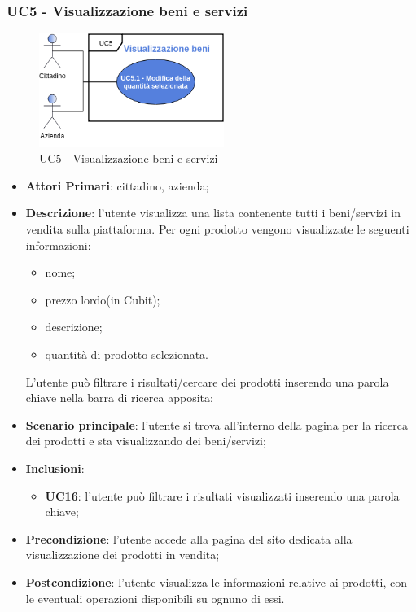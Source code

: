  \subsubsection{UC5 - Visualizzazione beni e servizi}
  \begin{figure}[H]
 	\includegraphics[width=6cm]{res/images/UC5-Generale.png}
 	\centering
 	\caption{UC5 - Visualizzazione beni e servizi}
 \end{figure}
 \begin{itemize}
 	\item \textbf{Attori Primari}: cittadino, azienda;
 	\item \textbf{Descrizione}: l'utente visualizza una lista contenente tutti i beni/servizi in vendita sulla piattaforma. Per ogni prodotto vengono visualizzate le seguenti informazioni:
 	\begin{itemize}
 		\item nome;
 		\item prezzo lordo\glosp (in Cubit\glo);
 		\item descrizione;
 		\item quantità di prodotto selezionata.
 	\end{itemize}
 	L'utente può filtrare i risultati/cercare dei prodotti inserendo una parola chiave nella barra di ricerca apposita;
 	\item \textbf{Scenario principale}: l'utente si trova all'interno della pagina per la ricerca dei prodotti e sta visualizzando dei beni/servizi;
	\item \textbf{Inclusioni}:
	\begin{itemize}
		\item \textbf{UC16}: l'utente può filtrare i risultati visualizzati inserendo una parola chiave;
	\end{itemize}
 	\item \textbf{Precondizione}: l'utente accede alla pagina del sito dedicata alla visualizzazione dei prodotti in vendita;
 	\item \textbf{Postcondizione}: l'utente visualizza le informazioni relative ai prodotti, con le eventuali operazioni disponibili su ognuno di essi.
 \end{itemize}
